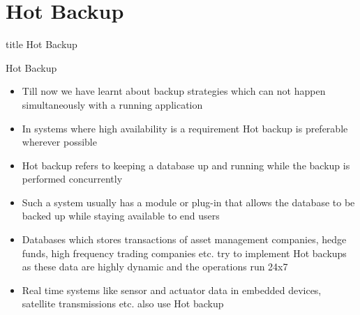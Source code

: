\documentclass[aspectratio=169, xcolor=dvipsnames]{beamer}
\begin{document}
\section{Hot Backup}

\begin{frame}
  \vfill
  \centering
  \begin{beamercolorbox}[sep=8pt,center,shadow=true,rounded=true]{title}
    Hot Backup\par%
  \end{beamercolorbox}
  \vfill
\end{frame}

\begin{frame}{Hot Backup}
    \begin{itemize}[<+->]
        \item Till now we have learnt about backup strategies which can not happen simultaneously with a running application
        \item In systems where high availability is a requirement Hot backup is preferable wherever possible
        \item Hot backup refers to keeping a database up and running while the backup is performed concurrently
        \item Such a system usually has a module or plug-in that allows the database to be backed up while staying available to end users
        \item Databases which stores transactions of asset management companies, hedge funds, high frequency trading companies etc. try to implement Hot backups as these data are highly dynamic and the operations run 24x7
        \item Real time systems like sensor and actuator data in embedded devices, satellite transmissions etc. also use Hot backup
    \end{itemize}
\end{frame}
\end{document}
